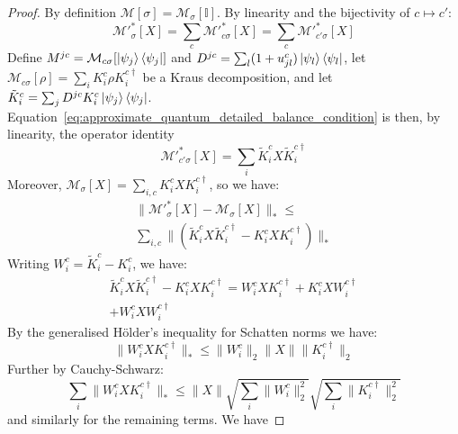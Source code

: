 \documentclass[aps,floatfix,10pt,amssymb,amsfont,amsmath,superscriptaddress,float,nofootinbib,longbibliography,nobalancelastpage,twocolumn]{revtex4-2}
\begin{document}
\begin{proof}
 By definition $\mathcal{M}[\sigma]=\mathcal{M}_{\sigma}[\mathbb{I}]$. By linearity and the bijectivity of $c \mapsto c'$:
    \begin{equation}
        \mathcal{M}'^*_{\sigma}[X] = \sum_{c}\mathcal{M}'^*_{c\sigma}[X] = \sum_{c}\mathcal{M}'^*_{c'\sigma}[X]
    \end{equation}
    Define $M^{jc} = \mathcal{M}_{c\sigma}[\ket{\psi_j}\bra{\psi_j}]$ and $D^{jc}=\sum_l(1+u_{jl}^{c})\ket{\psi_l}\bra{\psi_l}$, let $\mathcal{M}_{c\sigma}[\rho]=\sum_i K^c_i\rho K^{c\dagger}_i$ be a Kraus decomposition, and let $\tilde K^c_i=\sum_j D^{jc}K^c_i\ket{\psi_j}\bra{\psi_j}$. Equation~\eqref{eq:approximate_quantum_detailed_balance_condition} is then, by linearity, the operator identity
    \begin{equation}
        \mathcal{M}'^*_{c'\sigma}[X]=\sum_i\tilde K^c_iX\tilde K^{c\dagger}_i
    \end{equation}
    Moreover, $\mathcal{M}_{\sigma}[X] = \sum_{i,c}K^c_iXK^{c\dagger}_i$, so we have:
    \begin{multline}
        \|\mathcal{M}'^*_{\sigma}[X]-\mathcal{M}_\sigma[X]\|_* \leq \\\sum_{i,c}\Big\|\left(\tilde K^c_iX\tilde K^{c\dagger}_i-K^c_iXK^{c\dagger}_i\right)\Big\|_*
    \end{multline}
    Writing $W^c_i=\tilde K^c_i-K^c_i$, we have:
    \begin{multline}
        \tilde K^c_iX\tilde K^{c\dagger}_i-K^c_iXK^{c\dagger}_i = W^c_iXK^{c\dagger}_i + K^c_iXW^{c\dagger}_i \\+ W^c_iXW^{c\dagger}_i
    \end{multline}
    By the generalised H\"older's inequality for Schatten norms we have:
    \begin{equation}
        \Big\|W^c_iXK^{c\dagger}_i\Big\|_* \leq \|W^c_i\|_2\|X\| \|K^{c\dagger}_i\|_2
    \end{equation}
    Further by Cauchy-Schwarz:
    \begin{equation}
        \sum_i\Big\|W^c_iXK^{c\dagger}_i\Big\|_* \leq \|X\| \sqrt{\sum_i \|W^c_i \|^2_2}\sqrt{\sum_i \|K_i^{c\dagger}\|^2_2}
    \end{equation}
    and similarly for the remaining terms. We have 
    

\end{proof}
\end{document}
